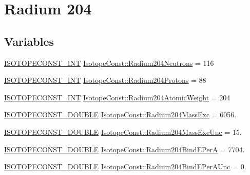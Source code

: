 \hypertarget{group___isotope_const-_radium-_ra204}{}\section{Radium 204}
\label{group___isotope_const-_radium-_ra204}
\subsection*{Variables}
\begin{DoxyCompactItemize}
\item 
\mbox{\hyperlink{group___isotope_const-_macros_ga5f18360b3e99483a35c32d789e62621c}{I\+S\+O\+T\+O\+P\+E\+C\+O\+N\+S\+T\+\_\+\+I\+NT}} \mbox{\hyperlink{group___isotope_const-_radium-_ra204_ga25d1db50cea6da15549b4e2dc5eb2d14}{Isotope\+Const\+::\+Radium204\+Neutrons}} = 116
\item 
\mbox{\hyperlink{group___isotope_const-_macros_ga5f18360b3e99483a35c32d789e62621c}{I\+S\+O\+T\+O\+P\+E\+C\+O\+N\+S\+T\+\_\+\+I\+NT}} \mbox{\hyperlink{group___isotope_const-_radium-_ra204_ga40ac474ba16cf9947ffc1a55156bfbdb}{Isotope\+Const\+::\+Radium204\+Protons}} = 88
\item 
\mbox{\hyperlink{group___isotope_const-_macros_ga5f18360b3e99483a35c32d789e62621c}{I\+S\+O\+T\+O\+P\+E\+C\+O\+N\+S\+T\+\_\+\+I\+NT}} \mbox{\hyperlink{group___isotope_const-_radium-_ra204_ga61e99624f90c397afb98f63d091953a2}{Isotope\+Const\+::\+Radium204\+Atomic\+Weight}} = 204
\item 
\mbox{\hyperlink{group___isotope_const-_macros_ga8f45a7272ce02c0b4c65c44636ed719a}{I\+S\+O\+T\+O\+P\+E\+C\+O\+N\+S\+T\+\_\+\+D\+O\+U\+B\+LE}} \mbox{\hyperlink{group___isotope_const-_radium-_ra204_gab12eaad4ad64374f30868cca52deedb9}{Isotope\+Const\+::\+Radium204\+Mass\+Exc}} = 6056.
\item 
\mbox{\hyperlink{group___isotope_const-_macros_ga8f45a7272ce02c0b4c65c44636ed719a}{I\+S\+O\+T\+O\+P\+E\+C\+O\+N\+S\+T\+\_\+\+D\+O\+U\+B\+LE}} \mbox{\hyperlink{group___isotope_const-_radium-_ra204_gae3868cacd048e862fc5bf1d90a611903}{Isotope\+Const\+::\+Radium204\+Mass\+Exc\+Unc}} = 15.
\item 
\mbox{\hyperlink{group___isotope_const-_macros_ga8f45a7272ce02c0b4c65c44636ed719a}{I\+S\+O\+T\+O\+P\+E\+C\+O\+N\+S\+T\+\_\+\+D\+O\+U\+B\+LE}} \mbox{\hyperlink{group___isotope_const-_radium-_ra204_ga7eb652d51a677b86bf38b6b78d10f757}{Isotope\+Const\+::\+Radium204\+Bind\+E\+PerA}} = 7704.
\item 
\mbox{\hyperlink{group___isotope_const-_macros_ga8f45a7272ce02c0b4c65c44636ed719a}{I\+S\+O\+T\+O\+P\+E\+C\+O\+N\+S\+T\+\_\+\+D\+O\+U\+B\+LE}} \mbox{\hyperlink{group___isotope_const-_radium-_ra204_ga2494b745ffaab5f8ee74c9ddf94ab924}{Isotope\+Const\+::\+Radium204\+Bind\+E\+Per\+A\+Unc}} = 0.

\end{DoxyCompactItemize}
